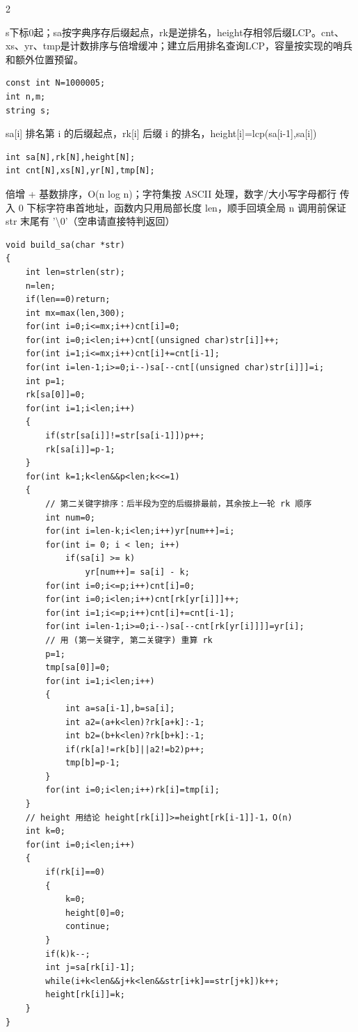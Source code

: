 \documentclass[UTF8,fontset=fandol,a4paper,twoside]{ctexart}
\newcommand{\note}[1]{{\fontsize{10}{12}\selectfont #1\par}}
\begin{document}
\begin{multicols}{2}
\note{s下标0起；sa按字典序存后缀起点，rk是逆排名，height存相邻后缀LCP。cnt、xs、yr、tmp是计数排序与倍增缓冲；建立后用排名查询LCP，容量按实现的哨兵和额外位置预留。}
\begin{lstlisting}
const int N=1000005;
int n,m;
string s;
\end{lstlisting}
\note{sa[\allowbreak{}i]\allowbreak{} 排名第 i 的后缀起点，rk[\allowbreak{}i]\allowbreak{} 后缀 i 的排名，height[\allowbreak{}i]\allowbreak{}=\allowbreak{}lcp(\allowbreak{}sa[\allowbreak{}i-\allowbreak{}1]\allowbreak{},\allowbreak{}sa[\allowbreak{}i]\allowbreak{})\allowbreak{}}
\begin{lstlisting}
int sa[N],rk[N],height[N];
int cnt[N],xs[N],yr[N],tmp[N];
\end{lstlisting}
\note{倍增 +\allowbreak{} 基数排序，O(\allowbreak{}n log n)\allowbreak{}；字符集按 ASCII 处理，数字/\allowbreak{}大小写字母都行 传入 0 下标字符串首地址，函数内只用局部长度 len，顺手回填全局 n 调用前保证 str 末尾有 '\textbackslash{}0'（空串请直接特判返回）}
\begin{lstlisting}
void build_sa(char *str)
{
    int len=strlen(str);
    n=len;
    if(len==0)return;
    int mx=max(len,300);
    for(int i=0;i<=mx;i++)cnt[i]=0;
    for(int i=0;i<len;i++)cnt[(unsigned char)str[i]]++;
    for(int i=1;i<=mx;i++)cnt[i]+=cnt[i-1];
    for(int i=len-1;i>=0;i--)sa[--cnt[(unsigned char)str[i]]]=i;
    int p=1;
    rk[sa[0]]=0;
    for(int i=1;i<len;i++)
    {
        if(str[sa[i]]!=str[sa[i-1]])p++;
        rk[sa[i]]=p-1;
    }
    for(int k=1;k<len&&p<len;k<<=1)
    {
        // 第二关键字排序：后半段为空的后缀排最前，其余按上一轮 rk 顺序
        int num=0;
        for(int i=len-k;i<len;i++)yr[num++]=i;
        for(int i= 0; i < len; i++)
            if(sa[i] >= k)
                yr[num++]= sa[i] - k;
        for(int i=0;i<=p;i++)cnt[i]=0;
        for(int i=0;i<len;i++)cnt[rk[yr[i]]]++;
        for(int i=1;i<=p;i++)cnt[i]+=cnt[i-1];
        for(int i=len-1;i>=0;i--)sa[--cnt[rk[yr[i]]]]=yr[i];
        // 用 (第一关键字, 第二关键字) 重算 rk
        p=1;
        tmp[sa[0]]=0;
        for(int i=1;i<len;i++)
        {
            int a=sa[i-1],b=sa[i];
            int a2=(a+k<len)?rk[a+k]:-1;
            int b2=(b+k<len)?rk[b+k]:-1;
            if(rk[a]!=rk[b]||a2!=b2)p++;
            tmp[b]=p-1;
        }
        for(int i=0;i<len;i++)rk[i]=tmp[i];
    }
    // height 用结论 height[rk[i]]>=height[rk[i-1]]-1，O(n)
    int k=0;
    for(int i=0;i<len;i++)
    {
        if(rk[i]==0)
        {
            k=0;
            height[0]=0;
            continue;
        }
        if(k)k--;
        int j=sa[rk[i]-1];
        while(i+k<len&&j+k<len&&str[i+k]==str[j+k])k++;
        height[rk[i]]=k;
    }
}
\end{lstlisting}

\end{multicols}
\end{document}
